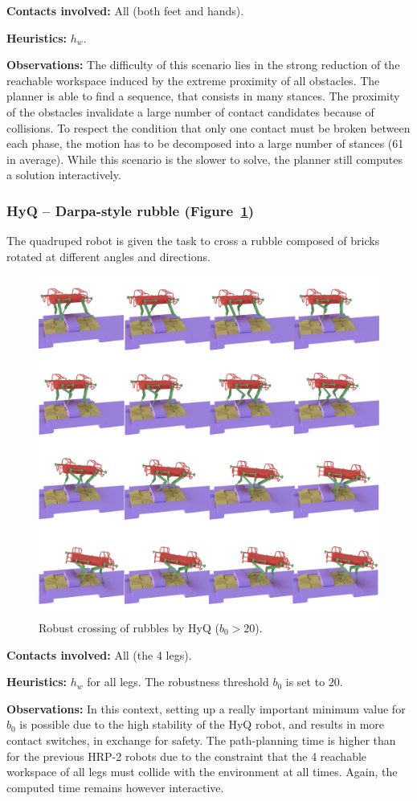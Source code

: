 \noindent\textbf{Contacts involved:} All (both feet and hands).

\noindent\textbf{Heuristics:} $h_w$.

\noindent\textbf{Observations:} The difficulty of this scenario lies in the strong reduction of the reachable workspace induced 
by the extreme proximity of all obstacles. The planner is able to find a sequence, that consists in many stances.
The proximity of the obstacles invalidate a large number of contact candidates because of collisions. To respect the condition
that only one contact must be broken between each phase, the motion has to be decomposed into a large number of stances (61 in average).
While this scenario is the slower to solve, the planner still computes a solution interactively.


\subsubsection{HyQ -- Darpa-style rubble (Figure~\ref{fig:darpa})}
The quadruped robot is given the task to cross a rubble composed of bricks rotated at different angles and directions.

\begin{figure}
  \centering
  \includegraphics[width=0.5\linewidth]{figures/darpa}
  \caption{
           Robust crossing of rubbles by HyQ ($b_0 > 20$). }
		   \label{fig:darpa}
\end{figure}


\noindent\textbf{Contacts involved:} All (the 4 legs).

\noindent\textbf{Heuristics:} $h_w$ for all legs. The robustness threshold $b_0$ is set to $20$.

\noindent\textbf{Observations:} In this context, setting up a really important minimum value for $b_0$ is possible due to the high
stability of the HyQ robot, and results in more contact switches, in exchange for safety. The path-planning time is higher than for the previous HRP-2 robots due to the constraint that the 4 reachable workspace of all legs must
collide with the environment at all times. %
Again, the computed time remains however interactive.

